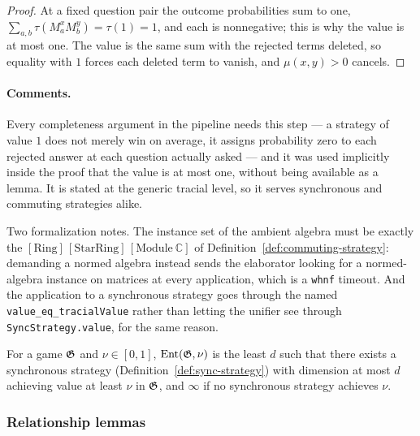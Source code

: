 \begin{proof}
\leanok
At a fixed question pair the outcome probabilities sum to one, $\sum_{a,b} \tau(M^x_a M^y_b)
= \tau(1) = 1$, and each is nonnegative; this is why the value is at most one. The value is
the same sum with the rejected terms deleted, so equality with $1$ forces each deleted term to
vanish, and $\mu(x,y) > 0$ cancels.
\end{proof}

\paragraph{Comments.} Every completeness argument in the pipeline needs this step --- a
strategy of value $1$ does not merely win on average, it assigns probability zero to each
rejected answer at each question actually asked --- and it was used implicitly inside the proof
that the value is at most one, without being available as a lemma. It is stated at the generic
tracial level, so it serves synchronous and commuting strategies alike.

Two formalization notes. The instance set of the ambient algebra must be exactly the
$[\mathrm{Ring}]\,[\mathrm{StarRing}]\,[\mathrm{Module}\ \mathbb{C}]$ of
Definition~\ref{def:commuting-strategy}: demanding a normed algebra instead sends the
elaborator looking for a normed-algebra instance on matrices at every application, which is a
\texttt{whnf} timeout. And the application to a synchronous strategy goes through the named
\texttt{value\_eq\_tracialValue} rather than letting the unifier see through
\texttt{SyncStrategy.value}, for the same reason.

\begin{definition}
\label{def:ent}
\leanok
\qlib{}
For a game $\mathfrak{G}$ and $\nu \in [0,1]$, $\mathrm{Ent}(\mathfrak{G}, \nu)$ is the least $d$ such that
there exists a synchronous strategy (Definition~\ref{def:sync-strategy}) with dimension at most $d$ achieving value at least
$\nu$ in $\mathfrak{G}$, and $\infty$ if no synchronous strategy achieves $\nu$.
\end{definition}


\subsubsection{Relationship lemmas}

